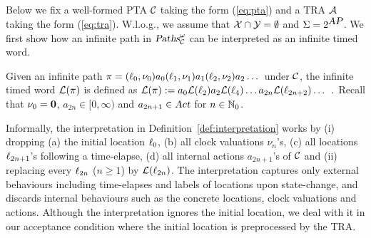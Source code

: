 Below we fix a well-formed PTA $\mathcal{C}$ taking the form (\ref{eq:pta}) and a TRA $\mathcal{A}$ taking the form (\ref{eq:tra}).
W.l.o.g., we assume that $\mathcal{X}\cap\mathcal{Y}=\emptyset$ and $\Sigma=2^{\mbox{\sl AP}}$.
We first show how an infinite path in $\mbox{\sl Paths}^\omega_{\mathcal{C}}$ can be interpreted as an infinite timed word.
%
\begin{definition}\label{def:interpretation}
Given an infinite path
$
    \pi
        =
            (\ell_0,\nu_0)
            a_0
            (\ell_1,\nu_1)
            a_1
            (\ell_2,\nu_2)a_2
            \dots
$
under $\mathcal{C}$, the infinite timed word $\mathcal{L}(\pi)$
is defined as
$
\mathcal{L}(\pi):=a_0\mathcal{L}(\ell_2)a_2\mathcal{L}(\ell_4)\dots a_{2n}\mathcal{L}(\ell_{2n+2}) \dots\enskip.
$
Recall that $\nu_0=\mathbf{0}$, $a_{2n}\in [0,\infty)$ and $a_{2n+1}\in\mbox{\sl Act}$ for $n\in\mathbb{N}_0$.
\end{definition}
%
\begin{remark}
Informally, the interpretation in Definition~\ref{def:interpretation} works
by (i) dropping (a) the initial location $\ell_0$, (b) all clock valuations $\nu_n$'s,
(c) all locations $\ell_{2n+1}$'s following a time-elapse,
(d) all internal actions $a_{2n+1}$'s of $\mathcal{C}$ and (ii) replacing every $\ell_{2n}$ ($n\ge 1$) by $\mathcal{L}(\ell_{2n})$.
The interpretation captures only external behaviours including time-elapses and labels of locations upon state-change, and discards internal behaviours such as the concrete locations, clock valuations and actions.
Although the interpretation ignores the initial location,
we deal with it in our acceptance condition where the initial location is preprocessed by the TRA.
\end{remark}
%
